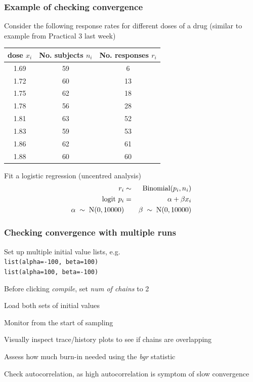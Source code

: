 \begin{frame}[t]

\frametitle{Example of checking convergence}

Consider the following response rates for different doses of a drug (similar to example from Practical 3 last week)

\begin{center}
\begin{tabular}{ccc}
dose $x_i$ & No. subjects $n_i$& No. responses $r_i$\\ \hline
1.69&59&6\\
1.72&60&13\\
1.75&62&18\\
1.78&56&28\\
1.81&63&52\\
1.83&59&53\\
1.86&62&61\\
1.88&60&60
\end{tabular}
\end{center}

Fit a logistic regression (uncentred analysis)
\begin{eqnarray*}
r_i & \sim & \hbox{Binomial}(p_i, n_i)\\
\hbox{logit } p_i & = & \alpha + \beta x_i\\
\alpha \; \sim \; {\rm N}(0, 10000) & &
\beta \; \sim\; {\rm N}(0, 10000)
\end{eqnarray*}

\end{frame}

\begin{frame}

\frametitle{Checking convergence with multiple runs}

\bibig
  \item Set up multiple initial value lists, e.g.\\ [2pt]
 \texttt{list(alpha=-100, beta=100)}\\
 \texttt{list(alpha=100, beta=-100)}\vspace{2mm}
  \item Before clicking \emph{compile}, set \emph{num of chains} to 2\vspace{2mm}
  \item Load both sets of initial values\vspace{2mm}
  \item Monitor from the start of sampling\vspace{2mm}
  \item Visually inspect trace/history plots to see if chains are
  overlapping\vspace{2mm}
  \item Assess how much burn-in needed using the \emph{bgr}
  statistic\vspace{2mm}
  \item Check autocorrelation, as high autocorrelation is symptom of
  slow convergence
\eibig

\end{frame}



